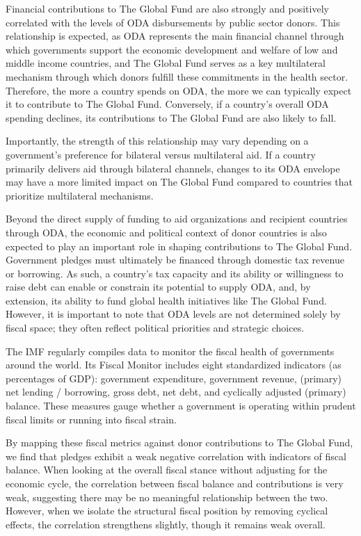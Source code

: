 \documentclass[
]{article}
\begin{document}
Financial contributions to The Global Fund are also strongly and
positively correlated with the levels of ODA disbursements by public
sector donors. This relationship is expected, as ODA represents the main
financial channel through which governments support the economic
development and welfare of low and middle income countries, and The
Global Fund serves as a key multilateral mechanism through which donors
fulfill these commitments in the health sector. Therefore, the more a
country spends on ODA, the more we can typically expect it to contribute
to The Global Fund. Conversely, if a country's overall ODA spending
declines, its contributions to The Global Fund are also likely to fall.

Importantly, the strength of this relationship may vary depending on a
government's preference for bilateral versus multilateral aid. If a
country primarily delivers aid through bilateral channels, changes to
its ODA envelope may have a more limited impact on The Global Fund
compared to countries that prioritize multilateral mechanisms.

Beyond the direct supply of funding to aid organizations and recipient
countries through ODA, the economic and political context of donor
countries is also expected to play an important role in shaping
contributions to The Global Fund. Government pledges must ultimately be
financed through domestic tax revenue or borrowing. As such, a country's
tax capacity and its ability or willingness to raise debt can enable or
constrain its potential to supply ODA, and, by extension, its ability to
fund global health initiatives like The Global Fund. However, it is
important to note that ODA levels are not determined solely by fiscal
space; they often reflect political priorities and strategic choices.

The IMF regularly compiles data to monitor the fiscal health of
governments around the world. Its Fiscal Monitor includes eight
standardized indicators (as percentages of GDP): government expenditure,
government revenue, (primary) net lending / borrowing, gross debt, net
debt, and cyclically adjusted (primary) balance. These measures gauge
whether a government is operating within prudent fiscal limits or
running into fiscal strain.

By mapping these fiscal metrics against donor contributions to The
Global Fund, we find that pledges exhibit a weak negative correlation
with indicators of fiscal balance. When looking at the overall fiscal
stance without adjusting for the economic cycle, the correlation between
fiscal balance and contributions is very weak, suggesting there may be
no meaningful relationship between the two. However, when we isolate the
structural fiscal position by removing cyclical effects, the correlation
strengthens slightly, though it remains weak overall.
\end{document}
